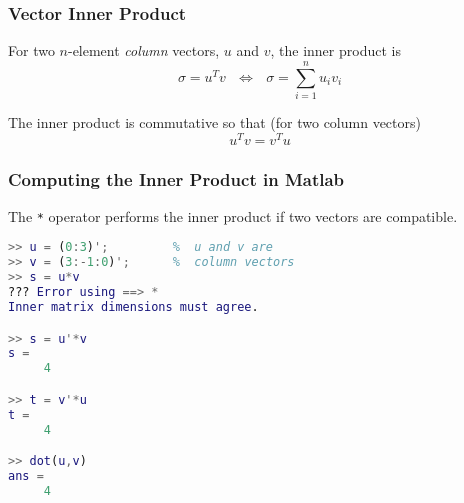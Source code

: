 \documentclass[10pt]{beamer}
\begin{document}
\begin{frame}
\frametitle{Vector Inner Product}

For two $n$-element \emph{column} vectors, $u$ and $v$, the inner product is
\begin{equation*}
    \sigma = u^T v\ \ \ \Longleftrightarrow\ \ \
    \sigma = \sum_{i = 1}^{n}{u_i v_i}
\end{equation*}

The inner product is commutative so that\newline
(for two column vectors)
\begin{equation*}
    u^T v = v^T u
\end{equation*}

\end{frame}
\begin{frame}[fragile]
\frametitle{Computing the Inner Product in Matlab}

The \verb|*| operator performs the inner product
if two vectors are compatible.

\begin{lstlisting}[language=matlab]
>> u = (0:3)';         %  u and v are
>> v = (3:-1:0)';      %  column vectors
>> s = u*v
??? Error using ==> *
Inner matrix dimensions must agree.

>> s = u'*v
s =
     4

>> t = v'*u
t =
     4

>> dot(u,v)
ans =
     4
\end{lstlisting}


\end{frame}
\end{document}
